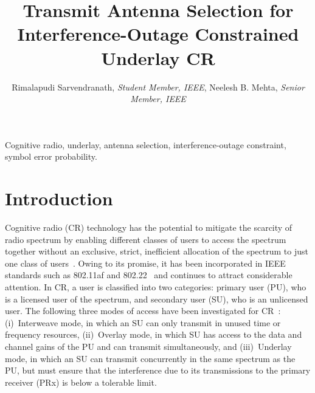 \documentclass[12pt,draftcls,peerreview,onecolumn]{IEEEtran}
\begin{document}
\title{Transmit Antenna Selection for Interference-Outage Constrained Underlay CR}

\author{Rimalapudi Sarvendranath, {\it Student Member, IEEE}, Neelesh B. Mehta, {\it Senior Member, IEEE}}

\setcounter{page}{1}

\maketitle

\begin{abstract}




\end{abstract}


\begin{IEEEkeywords}
Cognitive radio, underlay, antenna selection, interference-outage constraint, symbol error probability.
\end{IEEEkeywords}

\IEEEpeerreviewmaketitle



\section{Introduction}
\label{sec:intro}

Cognitive radio (CR) technology has the potential to mitigate the scarcity of radio spectrum by enabling different classes of users to access the spectrum together without an exclusive, strict, inefficient allocation of the spectrum to just one class of users~\cite{Goldsmith_2009_PIEEE}. Owing to its promise, it has been incorporated in IEEE standards such as 802.11af and 802.22~\cite{Sherman_2008_TCMAG} and continues to attract considerable attention. In CR, a user is classified into two categories: primary user (PU), who is a licensed user of the spectrum, and secondary user (SU), who is an unlicensed user. The following three modes of access have been investigated for CR~\cite{Goldsmith_2009_PIEEE}: (i)~Interweave mode, in which an SU can only transmit in unused time or frequency resources, (ii)~Overlay mode, in which SU has access to the data and channel gains of the  PU and can transmit simultaneously, and (iii)~Underlay mode, in which an SU can transmit concurrently in the same spectrum as the PU, but must ensure that the interference due to its transmissions to the primary receiver (PRx) is below a tolerable limit. 
\end{document}
